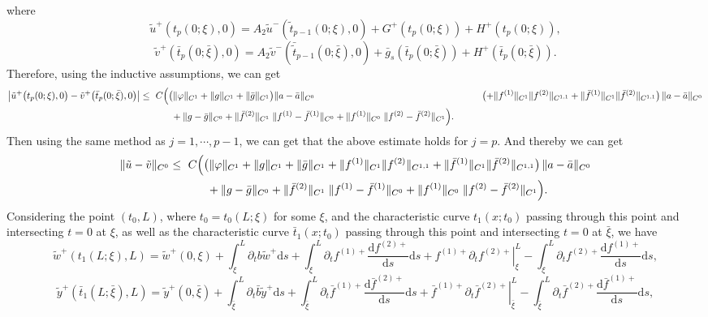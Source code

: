 \documentclass[a4paper,reqno,11pt]{amsart}
\numberwithin{equation}{section} %
\begin{document}
where
$$
\tilde{u}^{+}\left( t_p\left( 0;\xi \right) ,0 \right) =A_2\tilde{u}^{-}\left(\tilde{ t} _{p-1}\left( 0;\xi \right) ,0 \right) +G^+ \left( t_p(0;\xi ) \right) +H^+\left( t_p(0;\xi ) \right) ,
$$
$$
\tilde{v}^{+}\left( \bar{t}_p\left( 0;\bar{\xi} \right) ,0 \right) =A_2\tilde{v}^-\left( \bar{\tilde{t} }_{p-1}\left( 0;\bar{\xi} \right) ,0 \right) +\bar{g}_s\left( \bar{t}_p(0;\bar{\xi}) \right) +H^+\left( \bar{t}_p(0;\bar{\xi}) \right) .
$$
Therefore, using the inductive assumptions, we can get 
$$
\begin{aligned}
\bigl\lvert \tilde u^+\bigl(t_p(0;\xi),0\bigr)- \tilde{v}^{+}\bigl(\bar t_p(0;\bar\xi),0\bigr)\bigr\rvert
\le{}&\ C\Bigl(
  \bigl(\|\varphi\|_{C^{1}}+\|g\|_{C^{1}}+\|\bar g\|_{C^{1}}\bigr) \|a-\bar a\|_{C^{0}} \Bigr.
&\qquad   \bigl(+ \|f^{(1)}\|_{C^{1}}\|f^{(2)}\|_{C^{1,1}}
   + \|\bar f^{(1)}\|_{C^{1}}\|\bar f^{(2)}\|_{C^{1,1}}\bigr)\,
   \|a-\bar a\|_{C^{0}}\\
&\qquad + \Bigl. \|g-\bar g\|_{C^{0}}
  + \|\bar f^{(2)}\|_{C^{1}}\;\|f^{(1)}-\bar f^{(1)}\|_{C^{0}}
  + \|f^{(1)}\|_{C^{0}}\;\|f^{(2)}-\bar f^{(2)}\|_{C^{1}}
\Bigr).
\end{aligned}
$$
Then using the same method as $j=1,\cdots,p-1$, we can get that the above estimate holds for $j=p$. And thereby we can get
$$
\begin{aligned}
\|\tilde u-\tilde v\|_{C^{0}}
\le{}&\ C\Bigl(
  \bigl(\|\varphi\|_{C^{1}}+\|g\|_{C^{1}}+\|\bar g\|_{C^{1}}
  + \|f^{(1)}\|_{C^{1}}\|f^{(2)}\|_{C^{1,1}}
  + \|\bar f^{(1)}\|_{C^{1}}\|\bar f^{(2)}\|_{C^{1,1}}\bigr)\,
  \|a-\bar a\|_{C^{0}} \\
&\qquad + \|g-\bar g\|_{C^{0}}
  + \|\bar f^{(2)}\|_{C^{1}}\;\|f^{(1)}-\bar f^{(1)}\|_{C^{0}}
  + \|f^{(1)}\|_{C^{0}}\;\|f^{(2)}-\bar f^{(2)}\|_{C^{1}}
\Bigr).
\end{aligned}
$$
Considering the point $(t_0,L)$, where $t_0=t_0(L;\xi)$ for some $\xi$, and the characteristic curve $t_1(x;t_0)$ passing through this point and intersecting $t=0$ at $\xi$, as well as the characteristic curve $\bar{t}_1(x;t_0)$ passing through this point and intersecting $t=0$ at $\bar{\xi}$, we have
$$
\tilde{w}^+\left( t_1(L;\xi ),L \right) =\tilde{w}^+(0,\xi )+\int_{\xi}^L{\partial _tb\tilde{w}^+\mathrm{d}s}+\int_{\xi}^L{\partial _tf^{(1)+}\frac{\mathrm{d}f^{(2)+}}{\mathrm{d}s}\mathrm{d}s}+\left. f^{(1)+}\partial _tf^{(2)+} \right|_{\xi}^{L}-\int_{\xi}^L{\partial _tf^{(2)+}\frac{\mathrm{d}f^{(1)+}}{\mathrm{d}s}\mathrm{d}s,}
$$
$$
\tilde{y}^+\left( \bar{t}_1(L;\bar{\xi}),L \right) =\tilde{y}^+(0,\bar{\xi})+\int_{\bar{\xi}}^L{\partial _t\bar{b}\tilde{y}^+\mathrm{d}s}+\int_{\bar{\xi}}^L{\partial _t\bar{f}^{(1)+}\frac{\mathrm{d}\bar{f}^{(2)+}}{\mathrm{d}s}\mathrm{d}s}+\left. \bar{f}^{(1)+}\partial _t\bar{f}^{(2)+} \right|_{\bar{\xi}}^{L}-\int_{\bar{\xi}}^L{\partial _t\bar{f}^{(2)+}\frac{\mathrm{d}\bar{f}^{(1)+}}{\mathrm{d}s}\mathrm{d}s,}
$$
\end{document}

